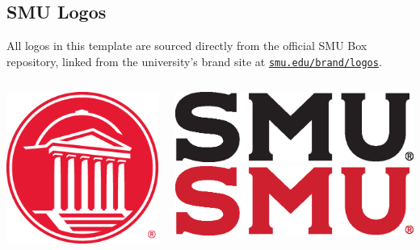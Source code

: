 \documentclass[12pt, aspectratio=169]{beamer}
\begin{document}
\subsection{SMU Logos}
\begin{frame}{\insertsubsection}
    All logos in this template are sourced directly from the official SMU Box repository, linked from the university's brand site at \href{https://www.smu.edu/brand/logos}{\texttt{smu.edu/brand/logos}}.
    \vspace{8pt}
    \begin{columns}
        \begin{column}{0.2\textwidth}
        \centering
        \includegraphics[width=.75\textwidth]{template-source/SMU_DallasHall_Icon_outlined_CMYK_lightbg.eps}
        \end{column}
        \begin{column}{0.2\textwidth}
        \centering
        \includegraphics[width=.67\textwidth]{template-source/SMU Logo_Formal_K.eps}\vspace{4pt}        
        \includegraphics[width=.67\textwidth]{template-source/SMU Logo_Formal_PMS_R.eps}\vspace{4pt}        

\end{column}
\end{columns}
\end{frame}
\end{document}
